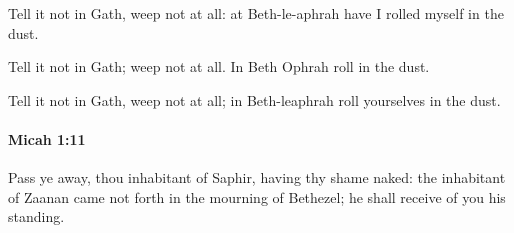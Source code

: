 			\begin{versebox}
					\item[BHS] 
					\item[LXX] 
					\item[ASV] Tell it not in Gath, weep not at all: at Beth-le-aphrah have I rolled myself in the dust.
					\item[NIV] Tell it not in Gath; weep not at all. In Beth Ophrah roll in the dust.
					\item[NRSV] Tell it not in Gath, weep not at all; in Beth-leaphrah roll yourselves in the dust.
			\end{versebox}

		\paragraph{Micah 1:11} %
			\label{MICAH-1-11}

			Pass ye away, thou inhabitant of Saphir, having thy shame naked: the inhabitant of Zaanan came not forth in the mourning of Bethezel; he shall receive of you his standing.

